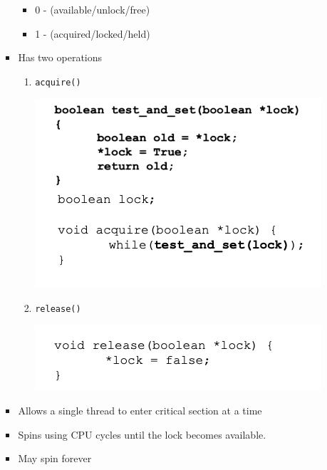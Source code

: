 \documentclass[12pt]{article}
\begin{document}
\begin{enumerate}[1.]
\begin{itemize}
\begin{itemize}
            \begin{itemize}
                \item 0 - (available/unlock/free)
                \item 1 - (acquired/locked/held)
            \end{itemize}

            \item Has two operations

            \begin{enumerate}[1.]
                \item \texttt{acquire()}

                \bigskip

                \begin{center}
                \includegraphics[width=0.7\linewidth]{images/midterm_2_solution_3.png}
                \end{center}

                \bigskip

                \item \texttt{release()}

                \bigskip

                \begin{center}
                \includegraphics[width=0.7\linewidth]{images/midterm_2_solution_4.png}
                \end{center}

                \bigskip
            \end{enumerate}
            \item Allows a single thread to enter critical section at a time
            \item Spins using CPU cycles until the lock becomes available.
            \item May spin forever
        \end{itemize}


\end{itemize}
\end{enumerate}
\end{document}
